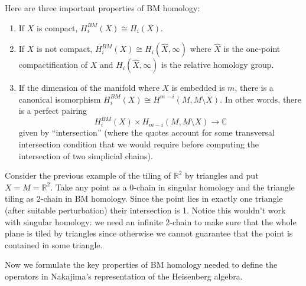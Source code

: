 \medskip\noindent
Here are three important properties of BM
homology:
\begin{enumerate}
\item If $X$ is compact, $H_i^{BM}(X)\cong
H_i(X)$.
\item If $X$ is not compact,
$H_i^{BM}(X)\cong H_i(\hat{X},\infty)$
where $\hat{X}$ is the one-point
compactification of $X$ and
$H_i(\hat{X},\infty)$ is the
relative homology group.
\item
\label{item-isomorphism-relative-cohomology}
If the dimension of the manifold
where $X$ is embedded is $m$,
there is a canonical isomorphism
$H_i^{BM}(X) \cong H^{m-i}(M,M\setminus X)$.
In other words, there is a perfect
pairing
$$
H_i^{BM}(X) \times H_{m-i}(M,M\setminus
X)\to \mathbb{C}
$$
given by ``intersection''
(where the quotes account for some
transversal intersection condition
that we would require before
computing the intersection of
two simplicial chains).
\end{enumerate}

Consider the previous example of
the tiling of $\mathbb{R}^2$
by triangles and put
$X=M=\mathbb{R}^2$.
Take any point as a 0-chain in singular
homology
and the triangle tiling as 2-chain in BM
homology.
Since the point lies in exactly one triangle
(after suitable perturbation)
their intersection is 1.
Notice this wouldn't work with
singular homology: we need an infinite
2-chain
to make sure that the whole plane
is tiled by triangles since
otherwise we cannot guarantee that the point
is contained in some triangle.

\medskip\noindent
Now we formulate the key properties
of BM homology needed to define the operators
in Nakajima's representation of the
Heisenberg algebra.

